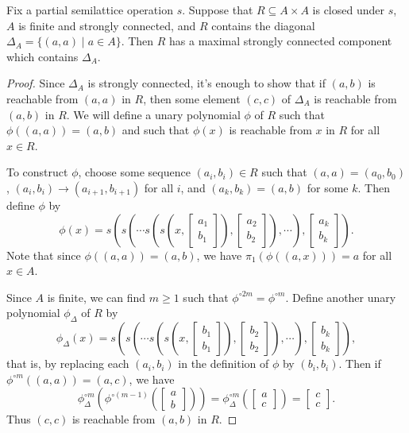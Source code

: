 \begin{thm}\label{strong-diagonal} Fix a partial semilattice operation $s$. Suppose that $R \subseteq A \times A$ is closed under $s$, $A$ is finite and strongly connected, and $R$ contains the diagonal $\Delta_A = \{(a,a) \mid a \in A\}$. Then $R$ has a maximal strongly connected component which contains $\Delta_A$.
\end{thm}
\begin{proof} Since $\Delta_A$ is strongly connected, it's enough to show that if $(a,b)$ is reachable from $(a,a)$ in $R$, then some element $(c,c)$ of $\Delta_A$ is reachable from $(a,b)$ in $R$. We will define a unary polynomial $\phi$ of $R$ such that $\phi((a,a)) = (a,b)$ and such that $\phi(x)$ is reachable from $x$ in $R$ for all $x \in R$.

To construct $\phi$, choose some sequence $(a_i,b_i) \in R$ such that $(a,a) = (a_0,b_0)$, $(a_i,b_i) \rightarrow (a_{i+1},b_{i+1})$ for all $i$, and $(a_k,b_k) = (a,b)$ for some $k$. Then define $\phi$ by
\[
\phi(x) = s\left(s\left(\cdots s\left(s\left(x,\begin{bmatrix}a_1\\b_1\end{bmatrix}\right), \begin{bmatrix}a_2\\b_2\end{bmatrix}\right),\cdots\right), \begin{bmatrix}a_k\\b_k\end{bmatrix}\right).
\]
Note that since $\phi((a,a)) = (a,b)$, we have $\pi_1(\phi((a,x))) = a$ for all $x \in A$.

Since $A$ is finite, we can find $m \ge 1$ such that $\phi^{\circ 2m} = \phi^{\circ m}$. Define another unary polynomial $\phi_\Delta$ of $R$ by
\[
\phi_\Delta(x) = s\left(s\left(\cdots s\left(s\left(x,\begin{bmatrix}b_1\\b_1\end{bmatrix}\right), \begin{bmatrix}b_2\\b_2\end{bmatrix}\right),\cdots\right), \begin{bmatrix}b_k\\b_k\end{bmatrix}\right),
\]
that is, by replacing each $(a_i,b_i)$ in the definition of $\phi$ by $(b_i,b_i)$. Then if $\phi^{\circ m}((a,a)) = (a,c)$, we have
\[
\phi_\Delta^{\circ m}\left(\phi^{\circ (m-1)}\left(\begin{bmatrix} a\\ b\end{bmatrix}\right)\right) = \phi_\Delta^{\circ m}\left(\begin{bmatrix} a\\ c\end{bmatrix}\right) = \begin{bmatrix} c\\ c\end{bmatrix}.
\]
Thus $(c,c)$ is reachable from $(a,b)$ in $R$.
\end{proof}

